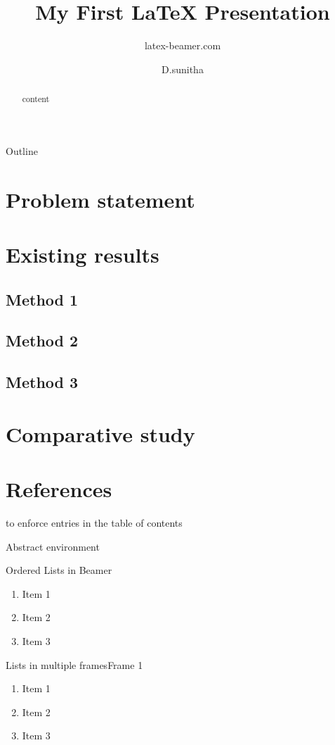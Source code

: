 \documentclass{beamer}
\title{My First \LaTeX{} Presentation}
\author{latex-beamer.com}
\institute{Online Beamer Tutorials}
\author{D.sunitha}
\begin{document}
\begin{frame}
    \titlepage
\end{frame}

\begin{frame}{Outline}
  \tableofcontents
 \end{frame}

\section{Problem statement}
 \section{Existing results}
   \subsection{Method 1}
   \subsection{Method 2}
   \subsection{Method 3}
\section{Comparative study}
 \section*{References}

 \begin{frame}
 to enforce entries in the table of contents
\end{frame}

 Abstract environment
\begin{abstract}
  content
\end{abstract}

 \begin{frame}{Ordered Lists in Beamer}
\begin{enumerate}
    \item Item 1
    \item Item 2
    \item Item 3
\end{enumerate}
 \end{frame}

\begin{frame}{Lists in multiple frames}{Frame 1}
\begin{enumerate}
    \item Item 1
    \item Item 2
   \item Item 3
   \setcounter{currentenumi}{\theenumi}
\end{enumerate}
 \end{frame}
\end{document}
